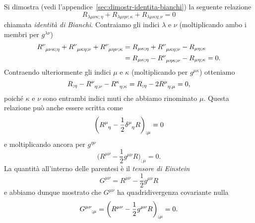 Si dimostra (vedi l'appendice~\ref{sec:dimostr-identita-bianchi}) la seguente
relazione
\begin{equation}
  \label{eq:bianchi}
  R_{\lambda\mu\nu\kappa;\eta} +
  R_{\lambda\mu\eta\nu;\kappa} + R_{\lambda\mu\kappa\eta;\nu} = 0
\end{equation}
chiamata \emph{identità di Bianchi}.  Contraiamo gli
indici $\lambda$ e $\nu$ (moltiplicando ambo i membri per $g^{\lambda\nu}$)
\begin{equation}
  \begin{split}
    \tensor{R}{^{\nu}_{\mu\nu\kappa;\eta}} +
      \tensor{R}{^{\nu}_{\mu\kappa\eta;\nu}} +
    \tensor{R}{^{\nu}_{\mu\eta\nu;\kappa}} &= R_{\mu\kappa;\eta} +
    \tensor{R}{^{\nu}_{\mu\kappa\eta;\nu}} - R_{\mu\eta;\kappa} \\
    &= R_{\mu\kappa;\eta} - \tensor{R}{^{\nu}_{\mu\eta\kappa;\nu}} -
    R_{\mu\eta;\kappa} = 0.
  \end{split}
\end{equation}
Contraendo ulteriormente gli indici $\mu$ e $\kappa$
(moltiplicando per $g^{\mu\kappa}$) otteniamo
\begin{equation}
  R_{;\eta} - \tensor{R}{^{\nu}_{\eta;\nu}} -
  \tensor{R}{^{\kappa}_{\eta;\kappa}} = R_{;\eta} - 2
  \tensor{R}{^{\mu}_{\eta;\mu}} = 0,
\end{equation}
poiché $\kappa$ e $\nu$ sono entrambi indici muti che abbiamo rinominato $\mu$.
Questa relazione può anche essere scritta come
\begin{equation}
  \bigg( \tensor{R}{^{\mu}_{\eta}} - \frac{1}{2} \tensor{\delta}{^{\mu}_{\eta}}
  R \bigg)_{;\mu} = 0
\end{equation}
e moltiplicando ancora per $g^{\eta\nu}$
\begin{equation}
  \bigg( R^{\mu\nu} - \frac{1}{2} g^{\mu\nu} R\bigg)_{;\mu} = 0.
\end{equation}
La quantità all'interno delle parentesi è il
\emph{tensore di Einstein}
\begin{equation}
  G^{\mu\nu} = R^{\mu\nu} - \frac{1}{2} g^{\mu\nu}R
\end{equation}
e abbiamo dunque mostrato che $G^{\mu \nu}$ ha quadridivergenza covariante nulla
\begin{equation}
  \label{eq:divergenza-tens-einstein}
  \tensor{G}{^{\mu\nu}_{;\mu}} = \bigg( R^{\mu\nu} - \frac{1}{2} g^{\mu\nu}
  R\bigg)_{;\mu} = 0.
\end{equation}

